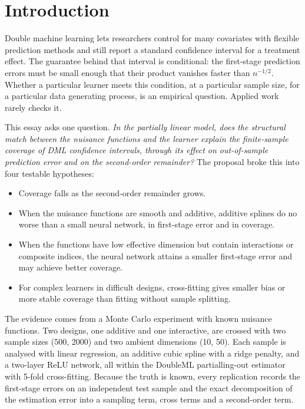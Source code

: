 \documentclass[11pt,a4paper]{article}
\begin{document}
\section{Introduction}

Double machine learning lets researchers control for many covariates with flexible prediction methods and still report a standard confidence interval for a treatment effect. The guarantee behind that interval is conditional: the first-stage prediction errors must be small enough that their product vanishes faster than $n^{-1/2}$. Whether a particular learner meets this condition, at a particular sample size, for a particular data generating process, is an empirical question. Applied work rarely checks it.

This essay asks one question. \emph{In the partially linear model, does the structural match between the nuisance functions and the learner explain the finite-sample coverage of DML confidence intervals, through its effect on out-of-sample prediction error and on the second-order remainder?} The proposal broke this into four testable hypotheses:
\begin{itemize}
\item[\textbf{H1.}] Coverage falls as the second-order remainder grows.
\item[\textbf{H2.}] When the nuisance functions are smooth and additive, additive splines do no worse than a small neural network, in first-stage error and in coverage.
\item[\textbf{H3.}] When the functions have low effective dimension but contain interactions or composite indices, the neural network attains a smaller first-stage error and may achieve better coverage.
\item[\textbf{H4.}] For complex learners in difficult designs, cross-fitting gives smaller bias or more stable coverage than fitting without sample splitting.
\end{itemize}

The evidence comes from a Monte Carlo experiment with known nuisance functions. Two designs, one additive and one interactive, are crossed with two sample sizes (500, 2000) and two ambient dimensions (10, 50). Each sample is analysed with linear regression, an additive cubic spline with a ridge penalty, and a two-layer ReLU network, all within the DoubleML partialling-out estimator with 5-fold cross-fitting. Because the truth is known, every replication records the first-stage errors on an independent test sample and the exact decomposition of the estimation error into a sampling term, cross terms and a second-order term.
\end{document}
